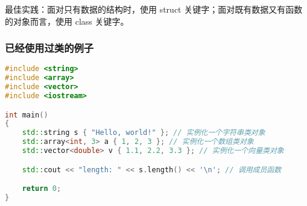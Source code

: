 \documentclass[../../LearnCpp.tex]{subfiles}
\begin{document}
最佳实践：面对只有数据的结构时，使用 struct 关键字；面对既有数据又有函数的对象而言，使用 class 关键字。

\subsubsection*{已经使用过类的例子}

\begin{lstlisting}[language=C++]
#include <string>
#include <array>
#include <vector>
#include <iostream>

int main()
{
    std::string s { "Hello, world!" }; // 实例化一个字符串类对象
    std::array<int, 3> a { 1, 2, 3 }; // 实例化一个数组类对象
    std::vector<double> v { 1.1, 2.2, 3.3 }; // 实例化一个向量类对象

    std::cout << "length: " << s.length() << '\n'; // 调用成员函数

    return 0;
}
\end{lstlisting}
\end{document}
